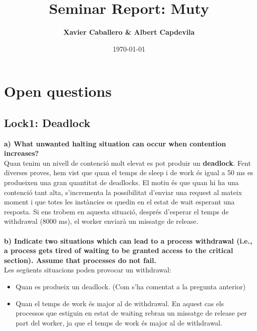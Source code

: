 \documentclass[a4paper, 10pt]{article}
\title{Seminar Report: Muty}
\author{\textbf{Xavier Caballero \& Albert Capdevila}}
\date{\normalsize\today{}}
\begin{document}
\maketitle

\section{Open questions}
\subsection{\textbf{Lock1: Deadlock}}
\textbf{a) What unwanted halting situation can occur when contention increases?\\}
Quan tenim un nivell de contenció molt elevat es pot produir un \textbf{deadlock}. Fent diverses proves, hem vist que quan el temps de sleep i de work és igual a 50 ms es produeixen una gran quantitat de deadlocks. El motiu és que quan hi ha una contenció tant alta, s’incrementa la possibilitat d’enviar una request al mateix moment i que totes les instàncies es quedin en el estat de wait esperant una resposta. Si ens trobem en aquesta situació, després d’esperar el temps de withdrawal (8000 ms), el worker enviarà un missatge de release.\\\\ 
\textbf{b) Indicate two situations which can lead to a process withdrawal (i.e., a process gets tired of waiting to be granted access to the critical section). Assume that processes do not fail.\\}
Les següents situacions poden provocar un withdrawal:
\begin{itemize}
\item Quan es produeix un deadlock. (Com s’ha comentat a la pregunta anterior)
\item Quan el temps de work és major al de withdrawal. En aquest cas els processos que estiguin en estat de waiting rebran un missatge de release per part del worker, ja que el temps de work és major al de withdrawal. 
\end{itemize}
\end{document}

